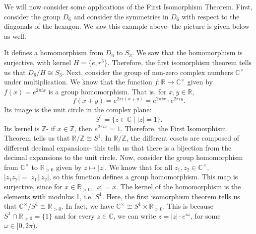 \documentclass[a4paper, openany]{memoir}
\theoremstyle{definition}
\theoremstyle{plain}
\begin{document}
We will now consider some applications of the First Isomorphism Theorem. First, consider the group $D_6$ and consider the symmetries in $D_6$ with respect to the diagonals of the hexagon. We saw this example above- the picture is given below as well.
\begin{figure}[H]
    \centering
\end{figure}
\noindent It defines a homomorphism from $D_6$ to $S_3$. We saw that the homomorphism is surjective, with kernel $H = \{e, r^3\}$. Therefore, the first isomorphism theorem tells us that $D_6/H \cong S_3$. Next, consider the group of non-zero complex numbers $\mathbb{C}^\times$ under multiplication. We know that the function $f: \mathbb{R} \to \mathbb{C}^{\times}$ given by $f(x) = e^{2\pi ix}$ is a group homomorphism. That is, for $x, y \in \mathbb{R}$,
\[f(x + y) = e^{2\pi i(x + y)} = e^{2\pi ix} \cdot e^{2\pi iy}.\]
Its image is the unit circle in the complex plane:
\[S^1 = \{z \in \mathbb{C} \mid |z| = 1\}.\]
Its kernel is $\mathbb{Z}$- if $x \in \mathbb{Z}$, then $e^{2\pi ix} = 1$. Therefore, the First Isomorphism Theorem tells us that $\mathbb{R}/\mathbb{Z} \cong S^1$. In $\mathbb{R}/\mathbb{Z}$, the different cosets are composed of different decimal expansions- this tells us that there is a bijection from the decimal expansions to the unit circle. Now, consider the group homomorphism from $\mathbb{C}^\times$ to $\mathbb{R}_{> 0}$ given by $z \mapsto |z|$. We know that for all $z_1, z_2 \in \mathbb{C}^\times$, $|z_1 z_2| = |z_1| |z_2|$, so this function defines a group homomorphism. This map is surjective, since for $x \in \mathbb{R}_{> 0}$, $|x| = x$. The kernel of the homomorphism is the elements with modulus 1, i.e. $S^1$. Here, the first isomorphism theorem tells us that $\mathbb{C}^\times/S^1 \cong \mathbb{R}_{> 0}$. In fact, we have $\mathbb{C}^\times \cong S^1 \times \mathbb{R}_{> 0}$. This is because $S^1 \cap \mathbb{R}_{> 0} = \{1\}$ and for every $z \in \mathbb{C}$, we can write $z = |z| \cdot e^{i \omega}$, for some $\omega \in [0, 2\pi)$.
\end{document}
